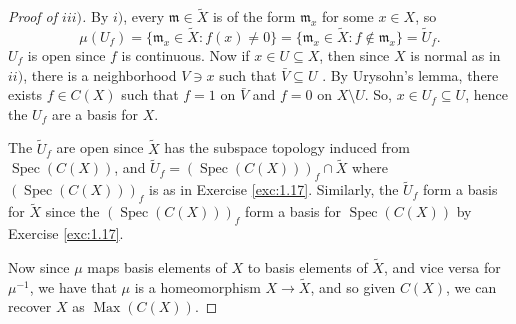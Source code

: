 \documentclass[12pt,letterpaper]{article}
\theoremstyle{definition}
\theoremstyle{remark}
\numberwithin{figure}{problem}
\numberwithin{equation}{section}
\DeclareMathOperator{\Spec}{Spec}
\DeclareMathOperator{\Max}{Max}
\begin{document}
\begin{proof}[Proof of $iii)$]
  By $i)$, every $\mathfrak{m} \in \tilde{X}$ is of the form $\mathfrak{m}_x$ for some $x \in X$, so
  \begin{equation*}
    \mu(U_f) = \{\mathfrak{m}_x \in \tilde{X} : f(x) \ne 0\} = \{\mathfrak{m}_x \in \tilde{X} : f \notin \mathfrak{m}_x\} = \tilde{U}_f.
  \end{equation*}
  $U_f$ is open since $f$ is continuous. Now if $x \in U \subseteq X$, then since $X$ is normal as in $ii)$, there is a neighborhood $V \ni x$ such that $\bar{V} \subseteq U$ \cite[Lem.~$31.1(b)$]{Mun00}. By Urysohn's lemma, there exists $f \in C(X)$ such that $f = 1$ on $\bar{V}$ and $f = 0$ on $X \setminus U$. So, $x \in U_f \subseteq U$, hence the $U_f$ are a basis for $X$.
  \par The $\tilde{U}_f$ are open since $\tilde{X}$ has the subspace topology induced from $\Spec(C(X))$, and $\tilde{U}_f = (\Spec(C(X)))_f \cap \tilde{X}$ where $(\Spec(C(X)))_f$ is as in Exercise \ref{exc:1.17}. Similarly, the $\tilde{U}_f$ form a basis for $\tilde{X}$ since the $(\Spec(C(X)))_f$ form a basis for $\Spec(C(X))$ by Exercise \ref{exc:1.17}.
  \par Now since $\mu$ maps basis elements of $X$ to basis elements of $\tilde{X}$, and vice versa for $\mu^{-1}$, we have that $\mu$ is a homeomorphism $X \to \tilde{X}$, and so given $C(X)$, we can recover $X$ as $\Max(C(X))$.
\end{proof}
\end{document}
